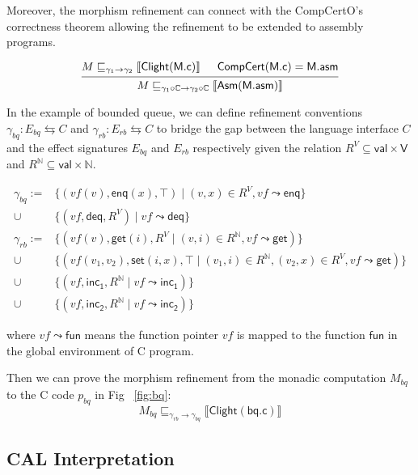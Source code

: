 \documentclass[sigplan,10pt,review,anonymous]{acmart}
\newcommand{\kw}[1]{\ensuremath{ \mathsf{#1} }}
\begin{document}
Moreover, the morphism refinement can connect with the CompCertO's correctness
theorem allowing the refinement to be extended to assembly programs.

\[
  \begin{prooftree}
    \hypo{M \sqsubseteq_{\gamma_1 \rightarrow \gamma_2} \llbracket \kw{Clight}(\kw{M.c}) \rrbracket}
    \hypo{\kw{CompCert}(\kw{M.c}) = \kw{M.asm}}
    \infer2{M \sqsubseteq_{\gamma_1 \circ \mathbb{C} \rightarrow \gamma_2 \circ \mathbb{C}} \llbracket \kw{Asm}(\kw{M.asm}) \rrbracket}
  \end{prooftree}
\]

In the example of bounded queue, we can define refinement conventions
$\gamma_{bq} : E_{bq} \leftrightarrows C$ and
$\gamma_{rb} : E_{rb} \leftrightarrows C$ to bridge the gap between the language
interface $C$ and the effect signatures $E_{bq}$ and $E_{rb}$ respectively given
the relation $R^V \subseteq \kw{val} \times \kw{V}$ and
$R^{\mathbb{N}}\subseteq \kw{val} \times \mathbb{N}$.

\begin{align*}
  \gamma_{bq}
   := & \{ (\mathit{vf}(v), \kw{enq}(x), \top) \mid (v, x) \in R^V, \mathit{vf}\leadsto \kw{enq} \} \\
  \cup & \{ (\mathit{vf}, \kw{deq}, R^V) \mid \mathit{vf}\leadsto \kw{deq}\} \\
  \gamma_{rb} := & \{ (\mathit{vf}(v), \kw{get}(i), R^V \mid (v,i)\in R^{\mathbb{N}}, \mathit{vf}\leadsto \kw{get})\} \\
  \cup & \{ (\mathit{vf}(v_1, v_2), \kw{set}(i, x), \top \mid (v_1,i)\in R^{\mathbb{N}}, (v_2,x)\in R^V, \mathit{vf}\leadsto \kw{get}) \} \\
  \cup & \{ (\mathit{vf}, \kw{inc_1}, R^{\mathbb{N}} \mid \mathit{vf}\leadsto \kw{inc_1})\} \\
  \cup & \{ (\mathit{vf}, \kw{inc_2}, R^{\mathbb{N}} \mid \mathit{vf}\leadsto \kw{inc_2})\}
\end{align*}

where $\mathit{vf} \leadsto \kw{fun}$ means the function pointer $\mathit{vf}$
is mapped to the function $\kw{fun}$ in the global environment of C program.

Then we can prove the morphism refinement from the monadic computation $M_{bq}$
to the C code $p_{bq}$ in Fig ~\ref{fig:bq}:
\[
  M_{bq} \sqsubseteq_{\gamma_{rb} \rightarrow \gamma_{bq}} \llbracket
  \kw{Clight}(\kw{bq.c}) \rrbracket
\]

\subsection{CAL Interpretation}
\end{document}
